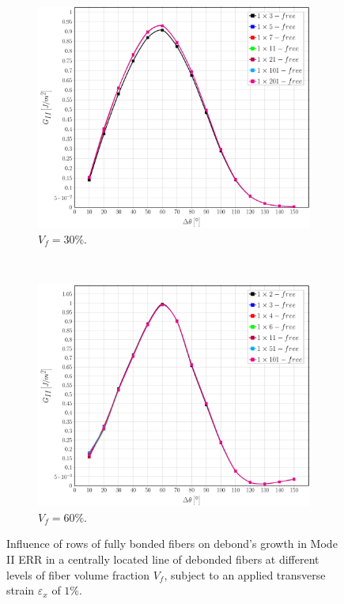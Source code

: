 \documentclass[review]{elsarticle}
\begin{document}
\begin{figure}[!h]
\centering
    \begin{subfigure}[b]{0.45\textwidth}
        \includegraphics[width=\textwidth]{abovefibers-vf30-GII.pdf}
        \caption{$V_{f}=30\%$.}\label{subfig:abovefiber30MII}
    \end{subfigure} ~
    \begin{subfigure}[b]{0.45\textwidth}
        \includegraphics[width=\textwidth]{abovefibers-vf60-GII.pdf}
        \caption{$V_{f}=60\%$.}\label{subfig:abovefiber60MII}
    \end{subfigure}

\caption{Influence of rows of fully bonded fibers on debond's growth in Mode II ERR in a centrally located line of debonded fibers at different levels of fiber volume fraction $V_{f}$, subject to an applied transverse strain $\varepsilon_{x}$ of $1\%$.}\label{fig:abovefibersMII}
\end{figure}
\end{document}
